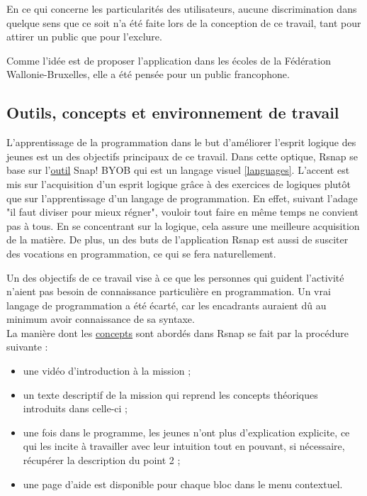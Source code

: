 En ce qui concerne les particularités des utilisateurs, aucune discrimination dans quelque sens que ce soit n'a été faite lors de la conception de ce travail, tant pour attirer un public que pour l'exclure. 

Comme l'idée est de proposer l'application dans les écoles de la Fédération Wallonie-Bruxelles, elle a été pensée pour un public francophone. 

\subsection{Outils, concepts et environnement de travail} 
\label{SNAP}
L'apprentissage de la programmation dans le but d'améliorer l'esprit logique des jeunes est un des objectifs principaux de ce travail. Dans cette optique, Rsnap se base sur l'\underline{outil} Snap! BYOB qui est un langage visuel \ref{languages}. L'accent est mis sur l'acquisition d'un esprit logique grâce à des exercices de logiques plutôt que sur l'apprentissage d'un langage de programmation.  En effet, suivant l'adage "il faut diviser pour mieux régner", vouloir tout faire en même temps ne convient pas à tous. En se concentrant sur la logique, cela assure une meilleure acquisition de la matière. De plus, un des buts de l'application Rsnap est aussi de susciter des vocations en programmation, ce qui se fera naturellement.

Un des objectifs de ce travail vise à ce que les personnes qui guident l'activité n'aient pas besoin de connaissance particulière en programmation. Un vrai langage de programmation a été écarté, car les encadrants auraient dû au minimum avoir connaissance de sa syntaxe.\\

La manière dont les \underline{concepts} sont abordés dans Rsnap se fait par la procédure suivante :
\begin{itemize}
	\item une vidéo d'introduction à la mission ;
	\item un texte descriptif de la mission qui reprend les concepts théoriques introduits dans celle-ci ;
	\item une fois dans le programme, les jeunes n'ont plus d'explication explicite, ce qui les incite à travailler avec leur intuition tout en pouvant, si nécessaire, récupérer la description du point 2 ;
	\item une page d'aide est disponible pour chaque bloc dans le menu contextuel. %
\end{itemize}

